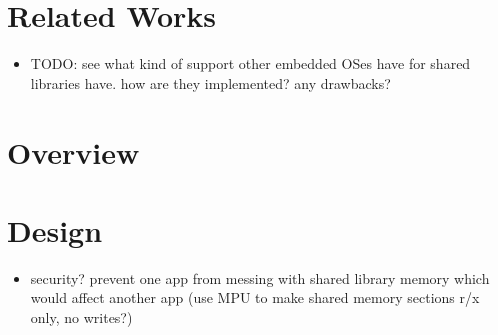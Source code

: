\documentclass{article}
\begin{document}
\section*{Related Works}

\begin{itemize}
    \item TODO: see what kind of support other embedded OSes have for shared libraries have. how are they implemented? any drawbacks?
\end{itemize}

\section*{Overview}

\section*{Design}

\begin{itemize}
    \item security? prevent one app from messing with shared library memory which would affect another app (use MPU to make shared memory sections r/x only, no writes?)
\end{itemize}
\end{document}
